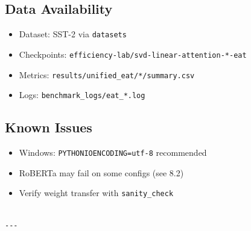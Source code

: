 \subsection{Data Availability}

\begin{itemize}
\item Dataset: SST-2 via \texttt{datasets}
\item Checkpoints: \texttt{efficiency-lab/svd-linear-attention-*-eat}
\item Metrics: \texttt{results/unified\_eat/*/summary.csv}
\item Logs: \texttt{benchmark\_logs/eat\_*.log}

\end{itemize}
\subsection{Known Issues}

\begin{itemize}
\item Windows: \texttt{PYTHONIOENCODING=utf-8} recommended
\item RoBERTa may fail on some configs (see  8.2)
\item Verify weight transfer with \texttt{sanity\_check}
\end{itemize}
\begin{lstlisting}

---
\end{lstlisting}